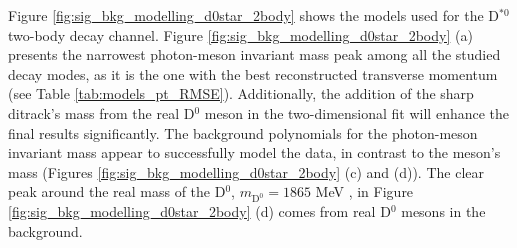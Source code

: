 Figure \ref{fig:sig_bkg_modelling_d0star_2body} shows the models used for the D$^{*0}$ two-body decay channel. Figure \ref{fig:sig_bkg_modelling_d0star_2body} (a) presents the narrowest photon-meson invariant mass peak among all the studied decay modes, as it is the one with the best reconstructed transverse momentum (see Table \ref{tab:models_pt_RMSE}). Additionally, the addition of the sharp ditrack's mass from the real D$^{0}$ meson in the two-dimensional fit will enhance the final results significantly. The background polynomials for the photon-meson invariant mass appear to successfully model the data, in contrast to the meson's mass (Figures \ref{fig:sig_bkg_modelling_d0star_2body} (c) and (d)). The clear peak around the real mass of the D$^{0}$, $m_{\text{D}^{0}} = 1865$ MeV \cite{PDG}, in Figure \ref{fig:sig_bkg_modelling_d0star_2body} (d) comes from real D$^{0}$ mesons in the background.
